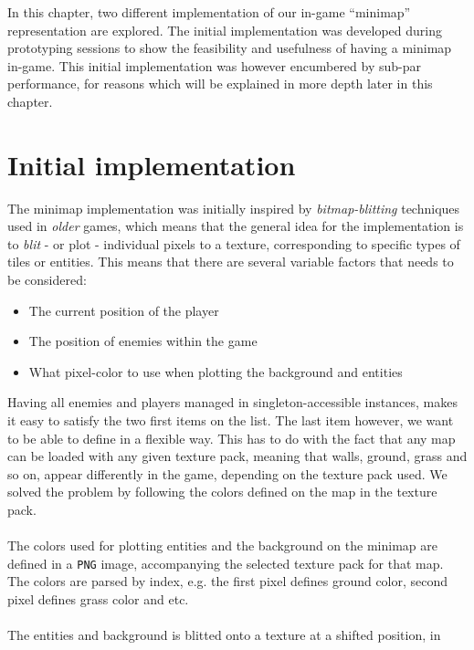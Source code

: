 In this chapter,  two different implementation of our in-game
``minimap'' representation are explored. The initial implementation was developed during prototyping sessions to show
the feasibility and usefulness of having a minimap in-game. This initial
implementation was however encumbered by sub-par performance,
for reasons which will be explained in more depth later in this chapter.

\section{Initial implementation}
The minimap implementation was initially inspired by \textit{bitmap-blitting}
techniques used in \textit{older} games, which means that the general idea for
the implementation is to \textit{blit} - or plot - individual pixels to a
texture, corresponding to specific types of tiles or entities. This means that
there are several variable factors that needs to be considered:
\begin{itemize}
    \item The current position of the player
    \item The position of enemies within the game 
    \item What pixel-color to use when plotting the background and entities
\end{itemize}
Having all enemies and players managed in singleton-accessible instances,
makes it easy to satisfy the two first items on the list. The last item
however, we want to be able to define in a flexible way. This
has to do with the fact that any map can be loaded with any given
texture pack, meaning that walls, ground, grass and so on, appear differently
in the game, depending on the texture pack used.
We solved the problem by following the colors defined on the map in the texture pack. 
\\
\\
The colors used for plotting entities and the background on the minimap are
defined in a \texttt{PNG} image, accompanying the selected texture pack for that
map. The colors are parsed by index, e.g. the first pixel defines ground
color, second pixel defines grass color and etc.
\\
\\
The entities and background is blitted onto a texture at a shifted position, in
